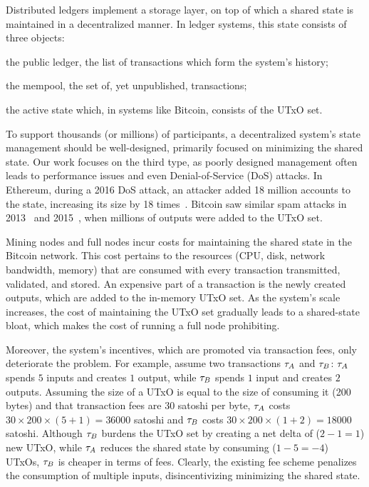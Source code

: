 Distributed ledgers implement a storage layer, on top of which a shared state
is maintained in a decentralized manner. In ledger systems, this state
consists of three objects:
\begin{inparaenum}[i)]
    \item the public ledger, \ie the list of transactions which form the
        system's history;
    \item the mempool, \ie the set of, yet unpublished, transactions;
    \item the active state which, in systems like Bitcoin, consists of the UTxO
        set.
\end{inparaenum}
To support thousands (or millions) of participants, a decentralized system's
state management should be well-designed, primarily focused on minimizing the
shared state. Our work focuses on the third type, as poorly designed management
often leads to performance issues and even Denial-of-Service (DoS) attacks. In
Ethereum, during a 2016 DoS attack, an attacker added 18 million accounts to
the state, increasing its size by 18 times~\cite{ethereum-dos}. Bitcoin saw
similar spam attacks in 2013~\cite{FCW:VasThoMoo14} and
2015~\cite{bitcoin-flooding}, when millions of outputs were added to the UTxO
set.

Mining nodes and full nodes incur costs for maintaining the shared state in the
Bitcoin network. This cost pertains to the resources (\ie CPU, disk, network
bandwidth, memory) that are consumed with every transaction transmitted,
validated, and stored. An expensive part of a transaction is the newly created
outputs, which are added to the in-memory UTxO set. As the system's scale
increases, the cost of maintaining the UTxO set gradually leads to a
shared-state bloat, which makes the cost of running a full node prohibiting.

Moreover, the system's incentives, which are promoted via transaction fees,
only deteriorate the problem. For example, assume two transactions $\tau_A$ and
$\tau_B$: $\tau_A$ spends $5$ inputs and creates $1$ output, while $\tau_B$ spends
$1$ input and creates $2$ outputs. Assuming the size of a UTxO is equal to the
size of consuming it (200 bytes) and that transaction fees are $30$ satoshi per
byte, $\tau_A$ costs $30 \times 200 \times (5+1) =  36000$ satoshi and $\tau_B$
costs $30 \times 200 \times (1+2) = 18000$ satoshi. Although $\tau_B$ burdens
the UTxO set by creating a net delta of ($2 - 1 = 1$) new UTxO, while $\tau_A$
reduces the shared state by consuming ($1 - 5 = -4$) UTxOs, $\tau_B$ is cheaper
in terms of fees. Clearly, the existing fee scheme penalizes the consumption of
multiple inputs, disincentivizing minimizing the shared state.
